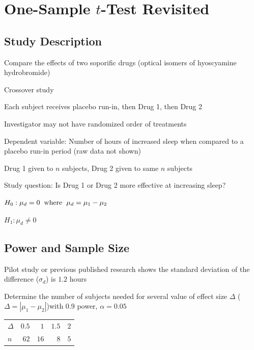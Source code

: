\section{One-Sample $t$-Test Revisited}

\subsection{Study Description}

\bi
\item Compare the effects of two soporific drugs (optical isomers of hyoscyamine hydrobromide)
\item Crossover study
\item Each subject receives placebo run-in, then Drug 1, then Drug 2
\item Investigator may not have randomized order of treatments
\item Dependent variable: Number of hours of increased sleep when
  compared to a placebo run-in period (raw data not shown)
\item Drug 1 given to $n$ subjects, Drug 2 given to same $n$ subjects
\item Study question: Is Drug 1 or Drug 2 more effective at increasing sleep?
  \bi
  \item $H_0: \mu_d = 0 \hspace{.2cm} \textrm{where} \hspace{.2cm} \mu_d = \mu_1 - \mu_2$
  \item $H_1: \mu_d \neq 0$
  \ei
\ei


\subsection{Power and Sample Size}

\bi
\item Pilot study or previous published research shows the standard deviation of the difference ($\sigma_d$) is $1.2$ hours
\item Determine the number of subjects needed for several value of effect size $\Delta$ ($\Delta = |\mu_1 - \mu_2|$)with 0.9 power, $\alpha = 0.05$
\ei

 \begin{center}
 \begin{tabular}{lrrrr}\hline\hline
$\Delta$ &$ 0.5$&$ 1$&$1.5$&$2$\\
$n$ &$62$&$16$&$8$&$5$\\
\hline
\end{tabular}
\end{center}

